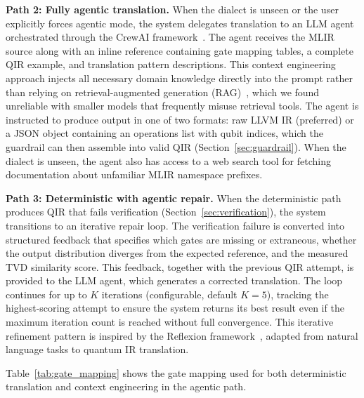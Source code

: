 \documentclass[conference]{IEEEtran}
\begin{document}
\textbf{Path 2: Fully agentic translation.} When the dialect is unseen or the user explicitly forces agentic mode, the system delegates translation to an LLM agent orchestrated through the CrewAI framework~\cite{hong2024crewai}. The agent receives the MLIR source along with an inline reference containing gate mapping tables, a complete QIR example, and translation pattern descriptions. This context engineering approach injects all necessary domain knowledge directly into the prompt rather than relying on retrieval-augmented generation (RAG)~\cite{lewis2020rag}, which we found unreliable with smaller models that frequently misuse retrieval tools. The agent is instructed to produce output in one of two formats: raw LLVM IR (preferred) or a JSON object containing an operations list with qubit indices, which the guardrail can then assemble into valid QIR (Section~\ref{sec:guardrail}). When the dialect is unseen, the agent also has access to a web search tool for fetching documentation about unfamiliar MLIR namespace prefixes.

\textbf{Path 3: Deterministic with agentic repair.} When the deterministic path produces QIR that fails verification (Section~\ref{sec:verification}), the system transitions to an iterative repair loop. The verification failure is converted into structured feedback that specifies which gates are missing or extraneous, whether the output distribution diverges from the expected reference, and the measured TVD similarity score. This feedback, together with the previous QIR attempt, is provided to the LLM agent, which generates a corrected translation. The loop continues for up to $K$ iterations (configurable, default $K=5$), tracking the highest-scoring attempt to ensure the system returns its best result even if the maximum iteration count is reached without full convergence. This iterative refinement pattern is inspired by the Reflexion framework~\cite{shinn2023reflexion}, adapted from natural language tasks to quantum IR translation.

Table~\ref{tab:gate_mapping} shows the gate mapping used for both deterministic translation and context engineering in the agentic path.
\end{document}
